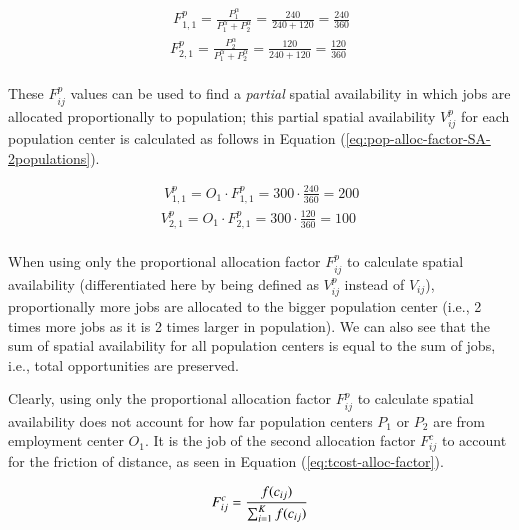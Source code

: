\documentclass[]{elsarticle} %
\begin{document}
\begin{equation}
\label{eq:pop-alloc-factor-2populations}
\begin{array}{l}\
F^p_{1,1} = \frac{P_1 ^\alpha}{P_1^\alpha + P_2^\alpha} = \frac{240}{240 + 120} = \frac{240}{360}\\
F^p_{2,1} = \frac{P_2^\alpha}{P_1^\alpha + P_2^\alpha}  = \frac{120}{240 + 120} = \frac{120}{360}\\
\end{array}
\end{equation}

These \(F^p_{ij}\) values can be used to find a \emph{partial} spatial
availability in which jobs are allocated proportionally to population;
this partial spatial availability \(V^p_{ij}\) for each population
center is calculated as follows in Equation
(\ref{eq:pop-alloc-factor-SA-2populations}).

\begin{equation}
\label{eq:pop-alloc-factor-SA-2populations}
\begin{array}{l}\
V^p_{1,1} = O_1 \cdot F^p_{1,1} = 300 \cdot \frac{240}{360} = 200 \\
V^p_{2,1} = O_1 \cdot F^p_{2,1} = 300 \cdot \frac{120}{360} = 100 \\
\end{array}
\end{equation}

When using only the proportional allocation factor \(F^p_{ij}\) to
calculate spatial availability (differentiated here by being defined as
\(V^p_{ij}\) instead of \(V_{ij}\)), proportionally more jobs are
allocated to the bigger population center (i.e., 2 times more jobs as it
is 2 times larger in population). We can also see that the sum of
spatial availability for all population centers is equal to the sum of
jobs, i.e., total opportunities are preserved.

Clearly, using only the proportional allocation factor \(F^p_{ij}\) to
calculate spatial availability does not account for how far population
centers \(P_1\) or \(P_2\) are from employment center \(O_1\). It is the
job of the second allocation factor \(F^c_{ij}\) to account for the
friction of distance, as seen in Equation (\ref{eq:tcost-alloc-factor}).

\begin{equation}
\label{eq:tcost-alloc-factor}
F^c_{ij} = \frac{f(c_{ij})}{\sum_{i=1}^K f(c_{ij})}\\
\end{equation}
\end{document}
